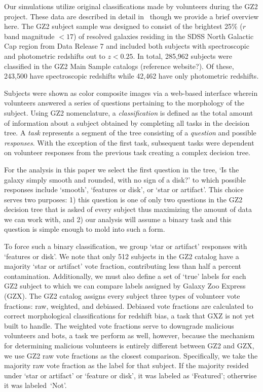 \documentclass[twocolumn]{aastex6}
\newcommand{\feat}{`Featured'}
\newcommand{\notfeat}{`Not'}
\begin{document}
Our simulations utilize original classifications made by volunteers during the GZ2 project. 
These data are described in detail in~\cite{Willett2013} though we provide a brief overview here.  
The GZ2 subject sample was designed to consist of the brightest 25\% ($r$ band magnitude $< 17$) 
of resolved galaxies residing in the SDSS North Galactic Cap region from Data Release 7 
and included both subjects with spectroscopic and photometric redshifts out to $z < 0.25$.
In total, 285,962 subjects were classified in the GZ2 Main Sample catalogs (reference website?). 
Of these, 243,500 have spectroscopic redshifts while 42,462 have only photometric redshifts.  

Subjects were shown as color composite images via a web-based interface wherein 
volunteers answered a series of questions pertaining to the morphology of the subject.
Using GZ2 nomenclature,  a \textit{classification} is defined as the total amount of
information about a subject obtained by completing all tasks in the decision tree. 
A \textit{task} represents a segment of the
tree consisting of a \textit{question} and possible \textit{responses}. 
With the exception of the first task, subsequent tasks were
dependent on volunteer responses from the previous task creating a complex decision tree. 

For the analysis in this paper we select the first question in the tree, 
`Is the galaxy simply smooth and rounded, with no sign of a disk?' to which possible 
responses include `smooth', `features or disk', or `star or artifact'. This choice
serves two purposes: 1) this question is one of only two questions in the GZ2
decision tree that is asked of every subject thus maximizing the amount of data
we can work with, and 2) our analysis will assume a 
binary task and this question is simple enough to mold into such a form. 

To force such a binary classification, we group `star or artifact' responses with `features or disk'. 
We note that only 512 subjects in the GZ2 catalog have a majority `star or artifact' vote 
fraction, contributing less than half a percent contamination. 
Additionally, we must also define a set of `true' labels for each GZ2 subject to which
we can compare labels assigned by Galaxy Zoo Express (GZX).  
The GZ2 catalog assigns every subject three types of volunteer vote fractions: 
raw, weighted, and debiased. 
Debiased vote fractions are calculated to correct morphological classifications
for redshift bias, a task that GXZ is not yet built to handle. 
The weighted vote fractions serve to downgrade malicious volunteers and bots, 
a task we perform as well, however, because the mechanism for
determining malicious volunteers is entirely different between GZ2 and GZX, we 
use GZ2 raw vote fractions as the closest comparison. 
Specifically, we take the majority raw vote fraction as the label for that subject. If the 
majority resided under `star or artifact' or `feature or disk', it was labeled as \feat; 
otherwise it was labeled~\notfeat. 
\end{document}
